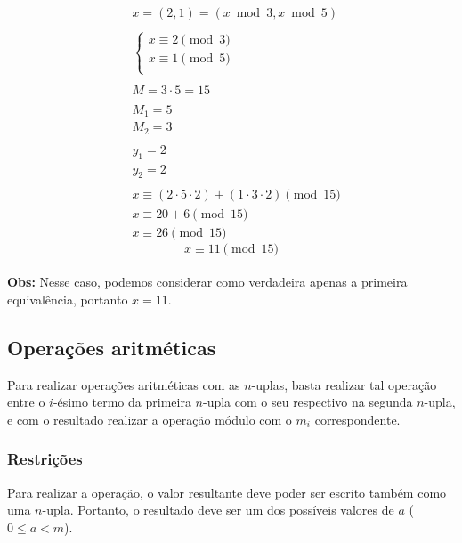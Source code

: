 \begin{align*}
     & x = (2,1) = (x \bmod 3, x \bmod 5)                            \\
    \\
     & \begin{cases}
           x \equiv 2 \pmod 3 \\
           x \equiv 1 \pmod 5 \\
       \end{cases}                                            \\
    \\
     & M = 3 \cdot 5 = 15                                            \\
    \\
     & M_1 = 5                                                       \\
     & M_2 = 3                                                       \\
    \\
     & y_1 = 2                                                       \\
     & y_2 = 2                                                       \\
    \\
     & x \equiv (2 \cdot 5 \cdot 2) + (1 \cdot 3 \cdot 2) \pmod {15} \\
     & x \equiv 20 + 6 \pmod {15}                                    \\
     & x \equiv 26 \pmod {15}
\end{align*}
\[
    \boxed{x \equiv 11 \pmod {15}}
\]\\
\textbf{Obs:} Nesse caso, podemos considerar como verdadeira apenas a primeira equivalência, portanto $x = 11$.

\subsection*{Operações aritméticas}
Para realizar operações aritméticas com as $n$-uplas, basta realizar tal operação entre o $i$-ésimo termo da primeira $n$-upla com o seu respectivo na segunda $n$-upla, e com o resultado realizar a operação módulo com o $m_i$ correspondente.

\subsubsection*{Restrições}
Para realizar a operação, o valor resultante deve poder ser escrito também como uma $n$-upla. Portanto, o resultado deve ser um dos possíveis valores de $a$ ($0 \leq a < m$).

